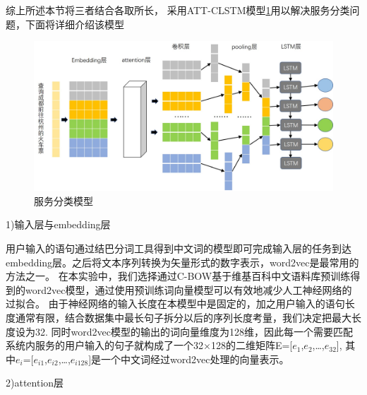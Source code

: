 综上所述本节将三者结合各取所长， 采用ATT-CLSTM模型\ref{fig:cnn-lstm}用以解决服务分类问题，下面将详细介绍该模型

\begin{figure}[htbp]
    \centering
    \includegraphics[scale=0.5]{./images/cnn-lstm.jpg}
    \caption{服务分类模型}
    \label{fig:cnn-lstm}
  \end{figure}


  1)输入层与embedding层

  用户输入的语句通过结巴分词工具得到中文词的模型即可完成输入层的任务到达embedding层。之后将文本序列转换为矢量形式的数字表示，word2vec是最常用的方法之一。
  在本实验中，我们选择通过C-BOW基于维基百科中文语料库预训练得到的word2vec模型，通过使用预训练词向量模型可以有效地减少人工神经网络的过拟合。
  由于神经网络的输入长度在本模型中是固定的，加之用户输入的语句长度通常有限，结合数据集中最长句子拆分以后的序列长度考量，我们决定把最大长度设为32.
  同时word2vec模型的输出的词向量维度为128维，因此每一个需要匹配系统内服务的用户输入的句子就构成了一个32×128的二维矩阵E=[$e_{1}$,$e_{2}$,\dots,$e_{32}$],
  其中$e_{i}$=[$e_{i1}$,$e_{i2}$,\dots,$e_{i128}$]是一个中文词经过word2vec处理的向量表示。

  2)attention层

